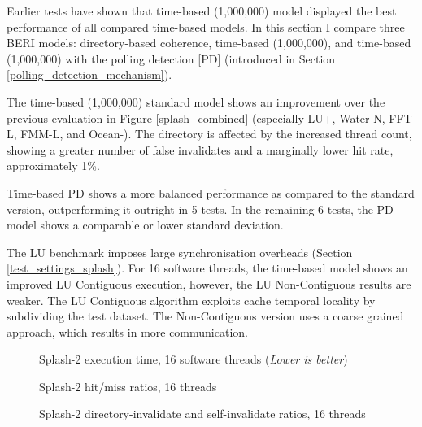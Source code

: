 		Earlier tests have shown that time-based (1,000,000) model displayed the best performance of all compared time-based models. In this section I compare three BERI models: directory-based coherence, time-based (1,000,000), and time-based (1,000,000) with the polling detection [PD] (introduced in Section \ref{polling_detection_mechanism}).
		
		The time-based (1,000,000) standard model shows an improvement over the previous evaluation in Figure \ref{splash_combined} (especially LU+, Water-N, FFT-L, FMM-L, and Ocean-). The directory is affected by the increased thread count, showing a greater number of false invalidates and a marginally lower hit rate, approximately 1\%. 
		
		Time-based PD shows a more balanced performance as compared to the standard version, outperforming it outright in 5 tests. In the remaining 6 tests, the PD model shows a comparable or lower standard deviation. 
		
		The LU benchmark imposes large synchronisation overheads (Section \ref{test_settings_splash}). For 16 software threads, the time-based model shows an improved LU Contiguous execution, however, the LU Non-Contiguous results are weaker. The LU Contiguous algorithm exploits cache temporal locality by subdividing the test dataset. The Non-Contiguous version uses a coarse grained approach, which results in more communication.
		
		
		\begin{figure}[!h]
		\centering 
			\caption[Splash-2 execution time, 16 software threads]{Splash-2 execution time, 16 software threads (\textit{Lower is better})} 
			\label{splash_16thread_freebsd}
		\end{figure}

\clearpage
		\begin{figure}[!h]
		\centering 
			\vspace{-7mm}
			\caption{Splash-2 hit/miss ratios, 16 threads} 
			\label{splash_16thread_hit_ratio}
		\end{figure}
		\begin{figure}[!h]
		\centering 
			\vspace{-7mm}
			\caption{Splash-2 directory-invalidate and self-invalidate ratios, 16 threads} 
			\label{splash_16thread_inv_ratio}
		\end{figure}
\vspace{-10mm}

